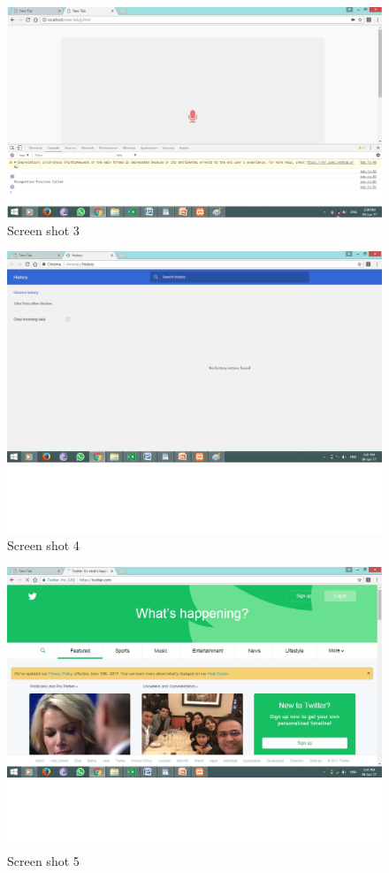 \documentclass[12pt]{report} %
\begin{document}
\begin{figure}[h]
	\centering
	\includegraphics[width=\linewidth]{figures/screen3.jpg}
	\caption{Screen shot 3}
	\label{fig:Screen short 3}
\end{figure}

\begin{figure}[h]
	\centering
	\includegraphics[width=\linewidth]{figures/screen4.jpg}
	\caption{Screen shot 4}
	\label{fig:Screen short 4}
\end{figure}

\begin{figure}[h]
	\centering
	\includegraphics[width=\linewidth]{figures/screen5.jpg}
	\caption{Screen shot 5}
	\label{fig:Screen short 5}
\end{figure}
\end{document}
